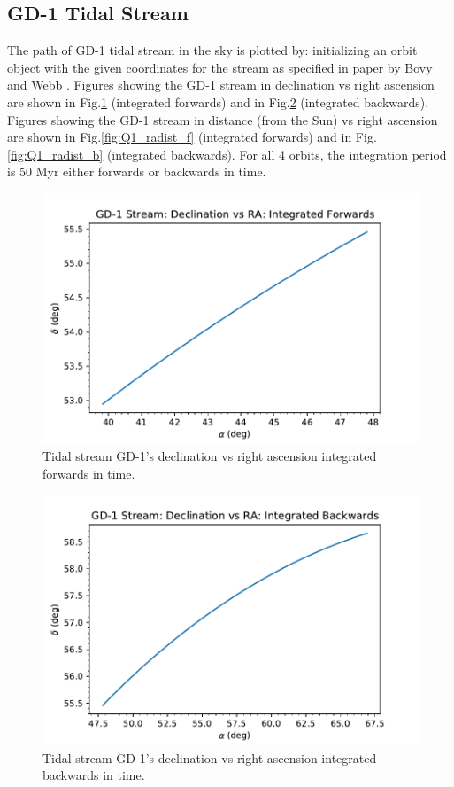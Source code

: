 \documentclass[apj]{emulateapj}
\begin{document}
\subsection{GD-1 Tidal Stream}
The path of GD-1 tidal stream in the sky is plotted by: initializing an orbit object with the given coordinates for the stream as specified in paper by Bovy and Webb \cite{GD-1}.
Figures showing the GD-1 stream in declination vs right ascension are shown in Fig.\ref{fig:Q1_radec_f} (integrated forwards) and in Fig.\ref{fig:Q1_radec_b} (integrated backwards).
Figures showing the GD-1 stream in distance (from the Sun) vs right ascension are shown in Fig.\ref{fig:Q1_radist_f} (integrated forwards) and in Fig.\ref{fig:Q1_radist_b} (integrated backwards).
For all 4 orbits, the integration period is 50 Myr either forwards or backwards in time.

\begin{figure}
    \centering
    \includegraphics[width=1.0\columnwidth]{Q1c_1.pdf}
    \caption{Tidal stream GD-1's declination vs right ascension integrated forwards in time.}
    \label{fig:Q1_radec_f}
\end{figure}

\begin{figure}
    \centering
    \includegraphics[width=1.0\columnwidth]{Q1c_3.pdf}
    \caption{Tidal stream GD-1's declination vs right ascension integrated backwards in time.}
    \label{fig:Q1_radec_b}
\end{figure}
\end{document}
